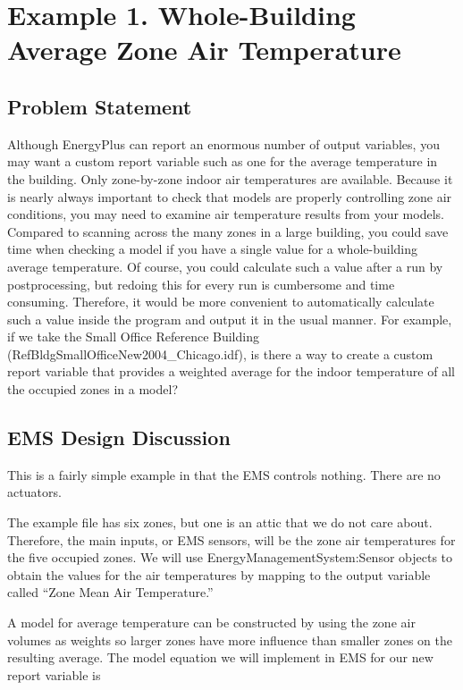 \section{Example 1. Whole-Building Average Zone Air Temperature}\label{example-1.-whole-building-average-zone-air-temperature}

\subsection{Problem Statement}\label{problem-statement}

Although EnergyPlus can report an enormous number of output variables, you may want a custom report variable such as one for the average temperature in the building. Only zone-by-zone indoor air temperatures are available. Because it is nearly always important to check that models are properly controlling zone air conditions, you may need to examine air temperature results from your models. Compared to scanning across the many zones in a large building, you could save time when checking a model if you have a single value for a whole-building average temperature. Of course, you could calculate such a value after a run by postprocessing, but redoing this for every run is cumbersome and time consuming. Therefore, it would be more convenient to automatically calculate such a value inside the program and output it in the usual manner. For example, if we take the Small Office Reference Building (RefBldgSmallOfficeNew2004\_Chicago.idf), is there a way to create a custom report variable that provides a weighted average for the indoor temperature of all the occupied zones in a model?

\subsection{EMS Design Discussion}\label{ems-design-discussion}

This is a fairly simple example in that the EMS controls nothing. There are no actuators.

The example file has six zones, but one is an attic that we do not care about. Therefore, the main inputs, or EMS sensors, will be the zone air temperatures for the five occupied zones. We will use EnergyManagementSystem:Sensor objects to obtain the values for the air temperatures by mapping to the output variable called ``Zone Mean Air Temperature.''

A model for average temperature can be constructed by using the zone air volumes as weights so larger zones have more influence than smaller zones on the resulting average. The model equation we will implement in EMS for our new report variable is

